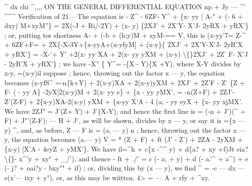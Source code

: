 \documentclass[12pt,a4paper]{article}
\begin{document}
\textasciicircum{}
dx
chi
\textasciicircum{},,,,
ON THE GENERAL DIFFERENTIAL EQUATION
np + Jy --- \textasciicircum{}'
\textasciicircum{}\textasciicircum{}\textasciicircum{}
Verification of
21.---The equation
is
- Z\textasciicircum{} - 6ZF- Y\textasciicircum{} + \{x- yy
| A-" + (- 6 + dxy) M+xyM''\}
= 2X(-J + Ri/-2Y) + (x- y) \{2XJ' + 2X'Y- X'J- 2yRX + yRX'\}
;
or, putting
tor shortness
A- + (-b + (h;y)M + xyM-== V,
this
is
(x-yy'7=
Z-\textasciicircum{} + 6ZF+F=
+ 2X\{-X-3Y+\{x-yyA+(x-yfyM]
+ (x-y\}\{ 2XJ' + 2X'Y-X'J- 2yR'X + yRX'\}
= -X-'+ Y' +2(x- yy XA + 2(x- yy yXM
+ (x-y) \textbackslash\{\}2XJ' + 2Z' F- X'J - 2yR'X + yRX'\}
;
we
have
-X'' \{ Y\textasciicircum{}= -\{X - Y)\{X +Y),
where X-Y
divides
by x-y,
=(x-y)il
suppose
;
hence, throwing out the
factor x --- y, the equation becomes
(x-yfS\textasciicircum{} =-n\{k+Y) + 2(x-y)XA + 2(x-y)yXM
+ 2XJ' + 2Z'F - Z' \{Z + F- (\guillemotleft{} - yy A\}
-2yX[2(x-y)M + 2(x- yy e\} + \{x - yy yMX',
= -n(Z+F) + 2ZJ'-Z'(Z-F)
+ 2\{x-y)XA-2(x-y) yXM
+ \{x-yy X'A - 4 (a; - yy eyX + \{x- yy xjMX'.
We have 2ZJ" = J'(Z+ Y) + J'\{X-Y), and hence the
first
line
is
= (-n + J')(\textasciicircum{} + F) + J"'(Z-F);
--- H + J', as
will
be
shown,
divides
by x --- y,
or
say
it
is =\{x --- y) \textasciicircum{},
and,
as
before,
Z --- F
is = (a; --- y) n
;
hence, throwing out
the
factor x --- y, the equation becomes
(a.--- y)\guillemotright{} V = * (Z + F) + ft (J' - Z') + 2ZA - 2yXM + \{x-y) [X'A - 4eyZ + yMX'\}.
We have
il=\textasciicircum{}h + c\{x -\textasciicircum{}\textasciicircum{} y) + d\{a? + xy +f)Jt eia? \textbackslash\{\}- x\textasciicircum{}'y + xy" +
\_\guillemotright{}/'),
and thence
- ft + ./' = c (- a; + y) + d (-
a.'\textasciicircum{} + a\textasciicircum{}) + e (- j? + oai?y - bxy"" + if)
;
or, dividing this by (x --- y), we
find
\textasciicircum{} = -c --- dx --- e(x'--- ixy + y"),
or, as
this may be
wiitten,
4> = --- A + rfy + \textasciicircum{}xy.
\end{document}
